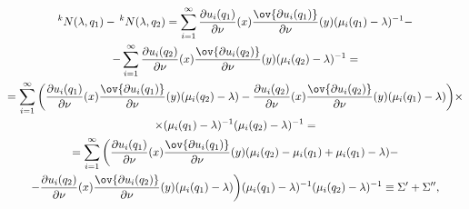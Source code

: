 \begin{gather*} 


^k N(\lambda,q_1)-\,^k N(\lambda,q_2)= 


\sum^\infty_{i=1}\frac{\partial u_i(q_1)}{\partial\nu}(x) 


\frac{\ov{\partial u_i(q_1)}}{\partial\nu}(y) 


(\mu_i(q_1)-\lambda)^{-1}- \\ 


% 


-\sum^\infty_{i=1}\frac{\partial u_i(q_2)}{\partial\nu}(x) 


\frac{\ov{\partial u_i(q_2)}}{\partial\nu}(y) 


(\mu_i(q_2)-\lambda)^{-1}=\\ 


% 


= 


\sum^\infty_{i=1}\bigg( 


\frac{\partial u_i(q_1)}{\partial\nu}(x) 


\frac{\ov{\partial u_i(q_1)}}{\partial\nu}(y) 


(\mu_i(q_2)-\lambda)- 


\frac{\partial u_i(q_2)}{\partial\nu}(x) 


\frac{\ov{\partial u_i(q_2)}}{\partial\nu}(y) 


(\mu_i(q_1)-\lambda)\bigg)\times \\ 


% 


\times(\mu_i(q_1)-\lambda)^{-1} 


(\mu_i(q_2)-\lambda)^{-1}=\\ 


% 


=\sum^\infty_{i=1}\bigg( 


\frac{\partial u_i(q_1)}{\partial\nu}(x) 


\frac{\ov{\partial u_i(q_1)}}{\partial\nu}(y) 


(\mu_i(q_2)-\mu_i(q_1)+\mu_i(q_1)-\lambda)-\\ 


% 


-\frac{\partial u_i(q_2)}{\partial\nu}(x) 


\frac{\ov{\partial u_i(q_2)}}{\partial\nu}(y) 


(\mu_i(q_1)-\lambda)\bigg) 


(\mu_i(q_1)-\lambda)^{-1}(\mu_i(q_2)-\lambda)^{-1} 


\equiv\Sigma'+\Sigma'', 


\end{gather*} 



